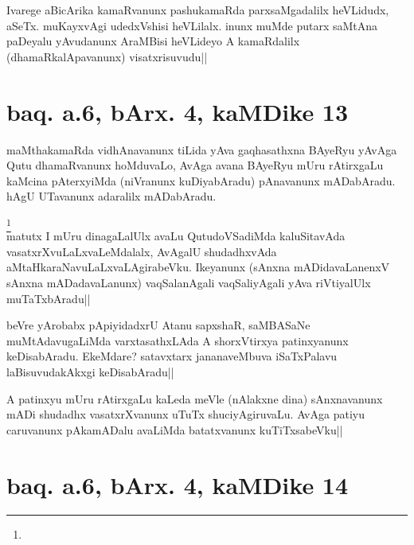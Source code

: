 \begin{artha}
Ivarege aBicArika kamaRvanunx pashukamaRda parxsaMgadalilx heVLidudx, 
aSeTx. muKayxvAgi udedxVshisi heVLilalx. inunx muMde putarx saMtAna 
paDeyalu yAvudanunx AraMBisi heVLideyo A kamaRdalilx 
(dhamaRkalApavanunx) visatxrisuvudu||
\end{artha}

\section*{baq. a.6, bArx. 4, kaMDike 13}

\stext

\begin{artha}
maMthakamaRda vidhAnavanunx tiLida yAva gaqhasathxna BAyeRyu yAvAga 
Qutu dhamaRvanunx hoMduvaLo, AvAga avana BAyeRyu mUru rAtirxgaLu 
kaMcina pAterxyiMda (niVranunx kuDiyabAradu) pAnavanunx mADabAradu. 
hAgU UTavanunx adaralilx mADabAradu.
\end{artha}


\begin{artha}
\footnote[1]{}\\
matutx I mUru dinagaLalUlx avaLu QutudoVSadiMda kaluSitavAda 
vasatxrXvuLaLxvaLeMdalalx, AvAgalU shudadhxvAda 
aMtaHkaraNavuLaLxvaLAgirabeVku. Ikeyanunx (sAnxna mADidavaLanenxV 
sAnxna mADadavaLanunx) vaqSalanAgali vaqSaliyAgali yAva riVtiyalUlx 
muTaTxbAradu||
\end{artha}

\begin{artha}
beVre yArobabx pApiyidadxrU Atanu sapxshaR, saMBASaNe muMtAdavugaLiMda 
varxtasathxLAda A shorxVtirxya patinxyanunx keDisabAradu. EkeMdare? 
satavxtarx jananaveMbuva iSaTxPalavu laBisuvudakAkxgi keDisabAradu||
\end{artha}


\begin{artha}
A patinxyu mUru rAtirxgaLu kaLeda meVle (nAlakxne dina) sAnxnavanunx 
mADi shudadhx vasatxrXvanunx uTuTx shuciyAgiruvaLu. AvAga patiyu 
caruvanunx pAkamADalu avaLiMda batatxvanunx kuTiTxsabeVku||
\end{artha}

\section*{baq. a.6, bArx. 4, kaMDike 14}

